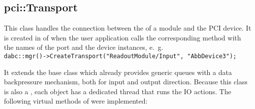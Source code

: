 \subsection{pci::Transport}
This class handles the connection between
the  of a module and the PCI device.
It is created in  of 
when the user application calls the corresponding 
method with the names of the port and the device instances, e.~g.~ \\
{\tt dabc::mgr()->CreateTransport("ReadoutModule/Input", "AbbDevice3");}

It extends the base class  which already provides
generic  queues with a data backpressure mechanism, 
both for input and output direction. 
Because this class is also a ,
each  object has a  dedicated thread that runs
the IO actions.
The following virtual methods of  were implemented:

